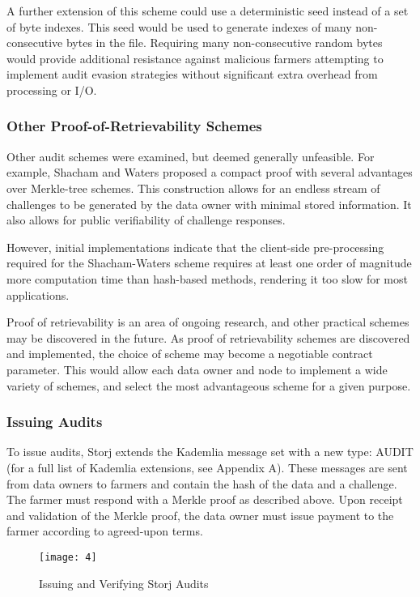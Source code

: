 \documentclass[a4paper,10pt]{article}
\begin{document}
A further extension of this scheme could use a deterministic seed instead of a
set of byte indexes. This seed would be used to generate indexes of many
non-consecutive bytes in the file. Requiring many non-consecutive random bytes
would provide additional resistance against malicious farmers attempting to
implement audit evasion strategies without significant extra overhead from
processing or I/O.

\subsubsection{Other Proof-of-Retrievability Schemes}
Other audit schemes were examined, but deemed generally unfeasible. For example,
Shacham and Waters proposed a compact proof \cite{6} with several advantages
over Merkle-tree schemes. This construction allows for an endless stream of
challenges to be generated by the data owner with minimal stored information. It
also allows for public verifiability of challenge responses.

However, initial implementations indicate that the client-side pre-processing
required for the Shacham-Waters scheme requires at least one order of magnitude
more computation time than hash-based methods, rendering it too slow for most
applications.

Proof of retrievability is an area of ongoing research, and other practical
schemes may be discovered in the future. As proof of retrievability schemes are
discovered and implemented, the choice of scheme may become a negotiable
contract parameter. This would allow each data owner and node to implement a
wide variety of schemes, and select the most advantageous scheme for a given
purpose.

\subsubsection{Issuing Audits}
To issue audits, Storj extends the Kademlia message set with a new type: AUDIT
(for a full list of Kademlia extensions, see Appendix A). These messages are
sent from data owners to farmers and contain the hash of the data and a
challenge. The farmer must respond with a Merkle proof as described above. Upon
receipt and validation of the Merkle proof, the data owner must issue payment to
the farmer according to agreed-upon terms.

\begin{figure}[hbt]
\centering
\texttt{[image: 4]}
\caption{Issuing and Verifying Storj Audits}
\end{figure}
\end{document}
